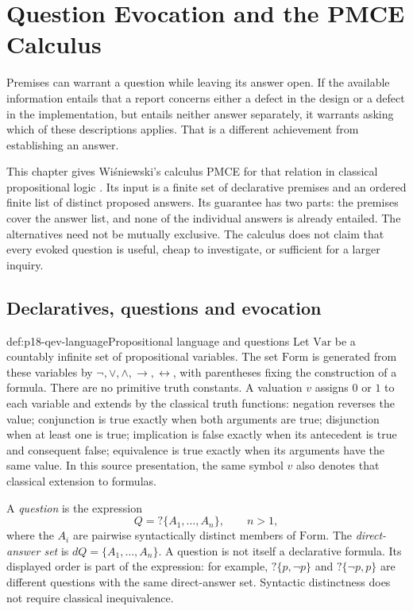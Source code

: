\chapter{Question Evocation and the PMCE Calculus}
\label{sec:p18-question-evocation}

Premises can warrant a question while leaving its answer open. If the
available information entails that a report concerns either a defect in
the design or a defect in the implementation, but entails neither answer
separately, it warrants asking which of these descriptions applies. That
is a different achievement from establishing an answer.

This chapter gives Wi\'sniewski's calculus PMCE for that relation in
classical propositional logic \cite{Wisniewski2016QuestionEvocation}.
Its input is a finite set of declarative premises and an ordered finite
list of distinct proposed answers. Its guarantee has two parts: the
premises cover the answer list, and none of the individual answers is
already entailed. The alternatives need not be mutually exclusive.
The calculus does not claim that every evoked question is useful, cheap
to investigate, or sufficient for a larger inquiry.

\section{Declaratives, questions and evocation}

\begin{hbdefinition}{def:p18-qev-language}{Propositional language and questions}
Let \(\mathrm{Var}\) be a countably infinite set of propositional
variables. The set \(\mathrm{Form}\) is generated from these variables
by \(\neg,\lor,\land,\to,\leftrightarrow\), with parentheses fixing
the construction of a formula. There are no primitive truth constants.
A valuation \(v\) assigns \(0\) or \(1\) to each variable and extends by
the classical truth functions: negation reverses the value; conjunction
is true exactly when both arguments are true; disjunction when at least
one is true; implication is false exactly when its antecedent is true
and consequent false; equivalence is true exactly when its arguments
have the same value. In this source presentation, the same symbol
\(v\) also denotes that classical extension to formulas.

A \emph{question} is the expression
\[
 Q=?\{A_1,\ldots,A_n\},\qquad n>1,
\]
where the \(A_i\) are pairwise syntactically distinct members of
\(\mathrm{Form}\). The \emph{direct-answer set} is
\(dQ=\{A_1,\ldots,A_n\}\). A question is not itself a declarative
formula. Its displayed order is part of the expression: for example,
\(?\{p,\neg p\}\) and \(?\{\neg p,p\}\) are different questions
with the same direct-answer set. Syntactic distinctness does not require
classical inequivalence.
\end{hbdefinition}

